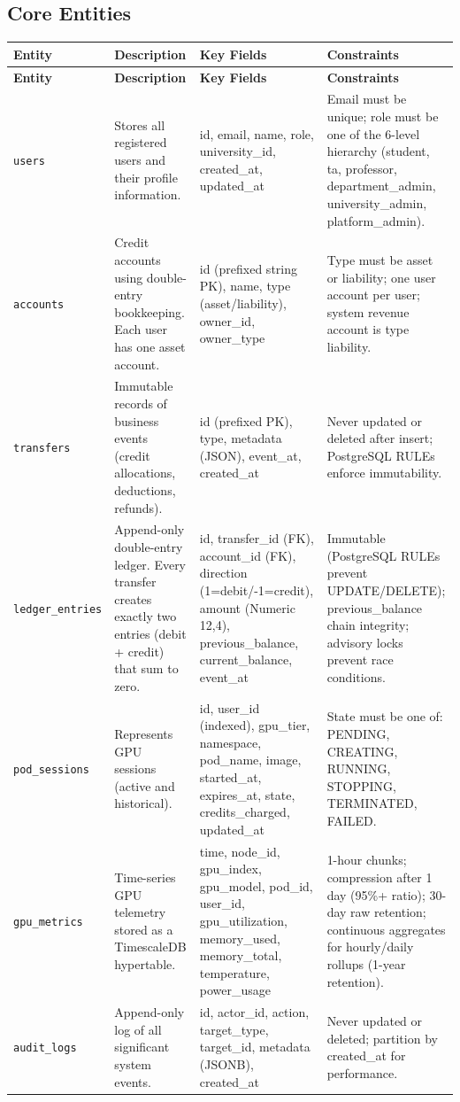 \documentclass[12pt,a4paper]{article}
\begin{document}
\subsection{Core Entities}

\begin{longtable}{@{}L{2.8cm}L{3.5cm}L{4cm}L{5cm}@{}}
    \textbf{Entity} & \textbf{Description} & \textbf{Key Fields} & \textbf{Constraints} \\
  \midrule
  \endfirsthead

    \textbf{Entity} & \textbf{Description} & \textbf{Key Fields} & \textbf{Constraints} \\
  \midrule
  \endhead

  \endfoot

  \texttt{users} & Stores all registered users and their profile information. & id, email, name, role, university\_id, created\_at, updated\_at & Email must be unique; role must be one of the 6-level hierarchy (student, ta, professor, department\_admin, university\_admin, platform\_admin). \\
    \texttt{accounts} & Credit accounts using double-entry bookkeeping. Each user has one asset account. & id (prefixed string PK), name, type (asset/liability), owner\_id, owner\_type & Type must be asset or liability; one user account per user; system revenue account is type liability. \\
  \texttt{transfers} & Immutable records of business events (credit allocations, deductions, refunds). & id (prefixed PK), type, metadata (JSON), event\_at, created\_at & Never updated or deleted after insert; PostgreSQL RULEs enforce immutability. \\
    \texttt{ledger\_entries} & Append-only double-entry ledger. Every transfer creates exactly two entries (debit + credit) that sum to zero. & id, transfer\_id (FK), account\_id (FK), direction (1=debit/-1=credit), amount (Numeric 12,4), previous\_balance, current\_balance, event\_at & Immutable (PostgreSQL RULEs prevent UPDATE/DELETE); previous\_balance chain integrity; advisory locks prevent race conditions. \\
  \texttt{pod\_sessions} & Represents GPU sessions (active and historical). & id, user\_id (indexed), gpu\_tier, namespace, pod\_name, image, started\_at, expires\_at, state, credits\_charged, updated\_at & State must be one of: PENDING, CREATING, RUNNING, STOPPING, TERMINATED, FAILED. \\
    \texttt{gpu\_metrics} & Time-series GPU telemetry stored as a TimescaleDB hypertable. & time, node\_id, gpu\_index, gpu\_model, pod\_id, user\_id, gpu\_utilization, memory\_used, memory\_total, temperature, power\_usage & 1-hour chunks; compression after 1 day (95\%+ ratio); 30-day raw retention; continuous aggregates for hourly/daily rollups (1-year retention). \\
  \texttt{audit\_logs} & Append-only log of all significant system events. & id, actor\_id, action, target\_type, target\_id, metadata (JSONB), created\_at & Never updated or deleted; partition by created\_at for performance. \\


\end{longtable}
\end{document}
